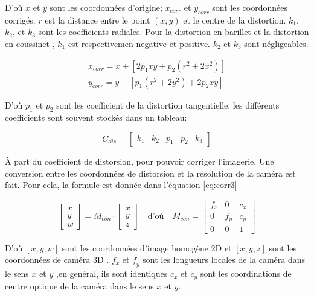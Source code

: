 \documentclass[
]{article}
\begin{document}
D'où \(𝑥\) et \(𝑦\) sont les coordonnées d'origine; \(x_{𝑐𝑜𝑟𝑟}\) et
\(y_{𝑐𝑜𝑟𝑟}\) sont les coordonnées corrigés. \(𝑟\) est la distance entre le
point \(\left(𝑥, 𝑦\right)\) et le centre de la distortion. \(𝑘_1\), \(𝑘_2\),
et \(𝑘_3\) sont les coefficients radiales. Pour la distortion en barillet et la distortion en coussinet , \(𝑘_1\) est respectivemen negative et positive. \(𝑘_2\) et \(𝑘_3\) sont négligeables.

\begin{equation}
\begin{aligned}
   x_{corr} = x+\left[ 2 p_1 x y+ p_2\left( r^2+2x^2\right) \right]\\
  y_{corr} = y+\left[ p_1 \left(r^2+2 y^2\right)+ 2p_2xy\right]
\end{aligned}
 \label{eq:corr2}
\end{equation}

D'où \(𝑝_1\) et \(𝑝_2\) sont les coefficient de la distortion tangentielle. les différents coefficients sont souvent stockés dans un tableau:

\begin{equation}
C_{dis}=
\begin{bmatrix}
k_1 & k_2 & p_1 & p_2 & k_3
\end{bmatrix}
\end{equation}

À part du coefficient de distorsion, pour pouvoir corriger l'imagerie, Une conversion entre les coordonnées de distorsion et la résolution de la caméra est
fait. Pour cela, la formule est donnée dans l'équation \eqref{eq:corr3}

\begin{equation}
\begin{bmatrix}
x\\
y\\
w
\end{bmatrix}
= M_{con} \cdot
\begin{bmatrix}
x\\
y\\
z
\end{bmatrix}
\quad \text{d'où} \quad
M_{con} =
\begin{bmatrix}
f_x & 0 & c_x\\
0 & f_y & c_y\\
0 & 0 &1
\end{bmatrix}
\label{eq:corr3}
\end{equation}

D'où \([𝑥, 𝑦, 𝑤]\) sont les coordonnées d'image homogène 2D et \([x, y , z]\) sont les coordonnées de caméra 3D . \(f_𝑥\) et \(𝑓_𝑦\) sont les longueurs locales de la caméra dans le sens \(𝑥\) et \(𝑦\) ,en genéral, ils sont identiques \(𝑐_𝑥\) et \(𝑐_𝑦\) sont les coordinations de centre optique de la caméra dans le sens \(𝑥\) et \(𝑦\).
\end{document}
